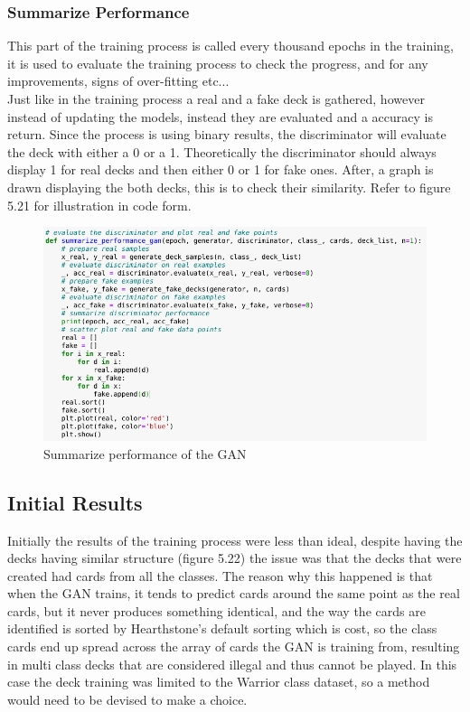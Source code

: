 \documentclass{report} %
\begin{document}
\subsubsection{Summarize Performance}
This part of the training process is called every thousand epochs in the training, it is used to evaluate the training process to check the progress, and for any improvements, signs of over-fitting etc...\\ Just like in the training process a real and a fake deck is gathered, however instead of updating the models, instead they are evaluated and a accuracy is return. Since the process is using binary results, the discriminator will evaluate the deck with either a 0 or a 1. Theoretically the discriminator should always display 1 for real decks and then either 0 or 1 for fake ones. After, a graph is drawn displaying the both decks, this is to check their similarity. Refer to figure 5.21 for illustration in code form.

\begin{figure}[H]
\centering
\includegraphics[width=1.25\textwidth]{sumPer}
\caption{Summarize performance of the GAN\protect}
\label{board}
\end{figure}
\subsection{Initial Results}

Initially the results of the training process were less than ideal, despite having the decks having similar structure (figure 5.22) the issue was that the decks that were created had cards from all the classes. The reason why this happened is that when the GAN trains, it tends to predict cards around the same point as the real cards, but it never produces something identical, and the way the cards are identified is sorted by Hearthstone's default sorting which is cost, so the class cards end up spread across the array of cards the GAN is training from, resulting in multi class decks that are considered illegal and thus cannot be played. In this case the deck training was limited to the Warrior class dataset, so a method would need to be devised to make a choice.  
\end{document}
